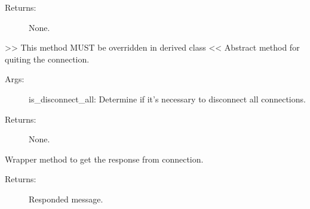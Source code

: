 \documentclass[letterpaper,10pt,english]{sphinxmanual}
\begin{document}
\begin{fulllineitems}
\begin{fulllineitems}
\begin{description}
\item[{Returns:}] \leavevmode
\sphinxAtStartPar
None.

\end{description}

\end{fulllineitems}


\begin{fulllineitems}
\label{\detokenize{QConnectionLibrary:QConnectionLibrary.connection_base.ConnectionBase.quit}}
\sphinxAtStartPar
\textgreater{}\textgreater{} This method MUST be overridden in derived class \textless{}\textless{}
Abstract method for quiting the connection.
\begin{description}
\item[{Args:}] \leavevmode
\sphinxAtStartPar
is\_disconnect\_all: Determine if it’s necessary to disconnect all connections.

\item[{Returns:}] \leavevmode
\sphinxAtStartPar
None.

\end{description}

\end{fulllineitems}


\begin{fulllineitems}
\label{\detokenize{QConnectionLibrary:QConnectionLibrary.connection_base.ConnectionBase.read_obj}}
\sphinxAtStartPar
Wrapper method to get the response from connection.
\begin{description}
\item[{Returns:}] \leavevmode
\sphinxAtStartPar
Responded message.

\end{description}

\end{fulllineitems}



\end{fulllineitems}
\end{document}
